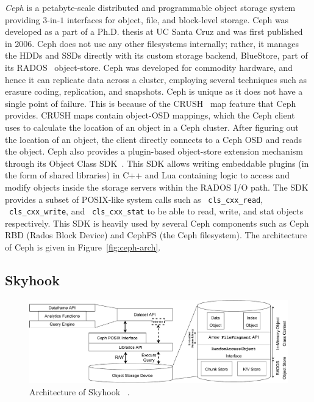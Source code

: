 \documentclass[11pt]{article}
\newcommand{\code}[1]{\colorbox{light-gray}{\texttt{#1}}}
\begin{document}
\textit{Ceph} is a petabyte-scale distributed and programmable object storage system providing $3$-in-$1$ interfaces for object, file, and block-level storage. Ceph was developed as a part of a Ph.D. thesis at UC Santa Cruz and was first published in 2006. Ceph does not use any other filesystems internally; rather, it manages the HDDs and SSDs directly with its custom storage backend, BlueStore, part of its RADOS~\cite{weil2007rados} object-store. Ceph was developed for commodity hardware, and hence it can replicate data across a cluster, employing several techniques such as erasure coding, replication, and snapshots. Ceph is unique as it does not have a single point of failure. This is because of the CRUSH~\cite{weil2006crush} map feature that Ceph provides. CRUSH maps contain object-OSD mappings, which the Ceph client uses to calculate the location of an object in a Ceph cluster. After figuring out the location of an object, the client directly connects to a Ceph OSD and reads the object. Ceph also provides a plugin-based object-store extension mechanism through its Object Class SDK~\cite{objectclasssdk}. This SDK allows writing embeddable plugins (in the form of shared libraries) in C++ and Lua containing logic to access and modify objects inside the storage servers within the RADOS I/O path. The SDK provides a subset of POSIX-like system calls such as ~\code{cls\_cxx\_read}, ~\code{cls\_cxx\_write}, and ~\code{cls\_cxx\_stat} to be able to read, write, and stat objects respectively. This SDK is heavily used by several Ceph components such as Ceph RBD (Rados Block Device) and CephFS (the Ceph filesystem). The architecture of Ceph is given in Figure~\ref{fig:ceph-arch}.

\subsection{Skyhook}
\begin{figure}[h]
\centering
\includegraphics[width=\textwidth]{figs/implarch.pdf}
\caption{Architecture of Skyhook ~\cite{jc2022skyhook}.}
\label{fig:skyhook-arch}
\end{figure}
\end{document}
